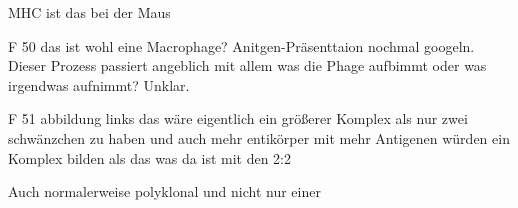 


MHC ist das bei der Maus

F 50 das ist wohl eine Macrophage?
Anitgen-Präsenttaion nochmal googeln. Dieser Prozess passiert angeblich mit allem was die Phage aufbimmt oder was
irgendwas aufnimmt? Unklar.

F 51 abbildung links das wäre eigentlich ein größerer Komplex als nur zwei schwänzchen zu haben und auch mehr
entikörper mit mehr Antigenen würden ein Komplex bilden als das was da ist mit den 2:2

Auch normalerweise polyklonal und nicht nur einer


